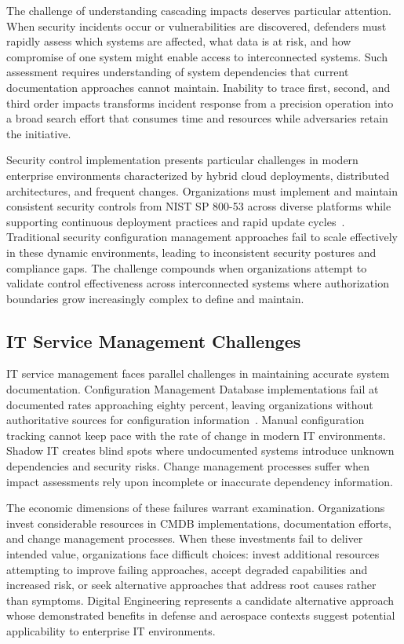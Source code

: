 The challenge of understanding cascading impacts deserves particular attention. When security incidents occur or vulnerabilities are discovered, defenders must rapidly assess which systems are affected, what data is at risk, and how compromise of one system might enable access to interconnected systems. Such assessment requires understanding of system dependencies that current documentation approaches cannot maintain. Inability to trace first, second, and third order impacts transforms incident response from a precision operation into a broad search effort that consumes time and resources while adversaries retain the initiative.

Security control implementation presents particular challenges in modern enterprise environments characterized by hybrid cloud deployments, distributed architectures, and frequent changes. Organizations must implement and maintain consistent security controls from NIST SP 800-53 across diverse platforms while supporting continuous deployment practices and rapid update cycles~\parencite{Force_2020}. Traditional security configuration management approaches fail to scale effectively in these dynamic environments, leading to inconsistent security postures and compliance gaps. The challenge compounds when organizations attempt to validate control effectiveness across interconnected systems where authorization boundaries grow increasingly complex to define and maintain.

\subsection{IT Service Management Challenges}

IT service management faces parallel challenges in maintaining accurate system documentation. Configuration Management Database implementations fail at documented rates approaching eighty percent, leaving organizations without authoritative sources for configuration information~\parencite{Gartner_CMDB_2019}. Manual configuration tracking cannot keep pace with the rate of change in modern IT environments. Shadow IT creates blind spots where undocumented systems introduce unknown dependencies and security risks. Change management processes suffer when impact assessments rely upon incomplete or inaccurate dependency information.

The economic dimensions of these failures warrant examination. Organizations invest considerable resources in CMDB implementations, documentation efforts, and change management processes. When these investments fail to deliver intended value, organizations face difficult choices: invest additional resources attempting to improve failing approaches, accept degraded capabilities and increased risk, or seek alternative approaches that address root causes rather than symptoms. Digital Engineering represents a candidate alternative approach whose demonstrated benefits in defense and aerospace contexts suggest potential applicability to enterprise IT environments.


